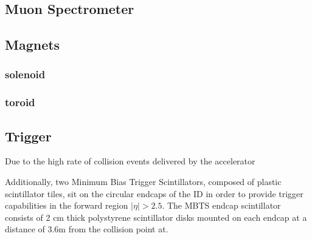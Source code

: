 \subsection{Muon Spectrometer} \label{sec:Musyst}
 






\subsection{Magnets} \label{sec:Magnets}


\subsubsection{solenoid} \label{sec:solenoid} 

\subsubsection{toroid} \label{sec:toroid} 




\subsection{Trigger} \label{sec:Trigger}
Due to the high rate of collision events delivered by the accelerator 

Additionally, two Minimum Bias Trigger Scintillators, composed of plastic scintillator tiles, sit on the circular endcaps of the ID in order to provide trigger capabilities in the forward region \(|\eta| > 2.5 \). The MBTS endcap scintillator consists of 2 cm thick polystyrene scintillator disks mounted on each endcap at a distance of 3.6m from the collision point at. 
